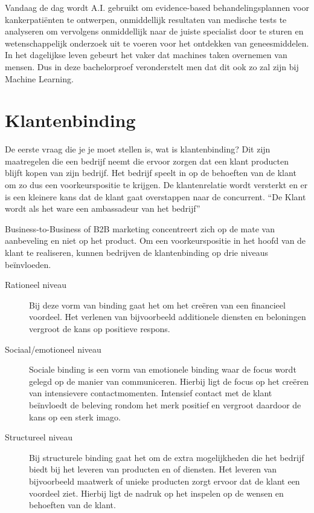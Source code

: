 Vandaag de dag wordt A.I. gebruikt om evidence-based behandelingsplannen voor kankerpatiënten te ontwerpen, onmiddellijk resultaten van medische tests te analyseren om vervolgens onmiddellijk naar de juiste specialist door te sturen en wetenschappelijk onderzoek uit te voeren voor het ontdekken van geneesmiddelen. In het dagelijkse leven gebeurt het vaker dat machines taken overnemen van mensen. Dus in deze bachelorproef veronderstelt men dat dit ook zo zal zijn bij Machine Learning. 

\section{Klantenbinding}
\label{sec:Klantenbinding}
De eerste vraag die je je moet stellen is, wat is klantenbinding? Dit zijn maatregelen die een bedrijf neemt die ervoor zorgen dat een klant producten blijft kopen van zijn bedrijf. Het bedrijf speelt in op de behoeften van de klant om zo dus een voorkeurspositie te krijgen. De klantenrelatie wordt versterkt en er is een kleinere kans dat de klant gaat overstappen naar de concurrent. “De Klant wordt als het ware een ambassadeur van het bedrijf”

Business-to-Business of B2B marketing concentreert zich op de mate van aanbeveling en niet op het product. Om een voorkeurspositie in het hoofd van de klant te realiseren, kunnen bedrijven de klantenbinding op drie niveaus beïnvloeden.

\begin{description}
	\item [Rationeel niveau]Bij deze vorm van binding gaat het om het creëren van een financieel voordeel. Het verlenen van bijvoorbeeld additionele diensten en beloningen vergroot de kans op positieve respons.
	\item [Sociaal/emotioneel niveau]Sociale binding is een vorm van emotionele binding waar de focus wordt gelegd op de manier van communiceren. Hierbij ligt de focus op het creëren van intensievere contactmomenten. Intensief contact met de klant beïnvloedt de beleving rondom het merk positief en vergroot daardoor de kans op een sterk imago.
	\item [Structureel niveau] Bij structurele binding gaat het om de extra mogelijkheden die het bedrijf biedt bij het leveren van producten en of diensten. Het leveren van bijvoorbeeld maatwerk of unieke producten zorgt ervoor dat de klant een voordeel ziet. Hierbij ligt de nadruk op het inspelen op de wensen en behoeften van de klant.
\end{description}

